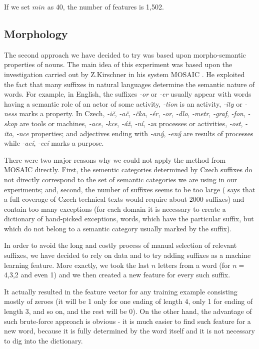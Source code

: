 \documentclass[letterpaper]{article}
\begin{document}
If we set $min$ as 40, the number of features is 1,502.

\subsection{Morphology}
The second approach we have decided to try was based upon morpho-semantic properties of nouns.
The main idea of this experiment was based upon the investigation carried out by Z.Kirschner in his system MOSAIC \cite{kirschner1983}. He exploited the fact that many suffixes in natural languages determine the semantic nature of words. For example, in English, the suffixes {\it -or} or {\it -er} usually appear with words having a semantic role of an actor of some activity, {\it -tion} is an activity, {\it -ity} or {\it -ness} marks a property. In Czech,  {\it -i\v{c}}, {\it -a\v{c}}, {\it -\v{c}ka}, {\it -\'{e}r}, {\it -or}, {\it -dlo}, {\it -metr}, {\it -graf}, {\it -fon}, {\it -skop} are tools or machines, {\it -ace}, {\it -kce}, {\it -\'{a}\v{z}}, {\it -n\'{i}}, {\it -za} processes or activities,
{\it -ost}, {\it -ita}, {\it -nce} properties; and adjectives ending with {\it -an\'{y}}, {\it -en\'{y}} are results of processes while {\it -ac\'{i}}, {\it -ec\'{i}} marks a purpose.

There were two major reasons why we could not apply the method from MOSAIC directly. First, the sementic categories determined by Czech suffixes do not directly correspond to the set of semantic categories we are using in our experiments; and, second, the number of suffixes seems to be too large (\cite{kirschner1983} says that a full coverage of Czech technical texts would require about 2000 suffixes) and contain too many exceptions (for each domain it is necessary to create a dictionary of hand-picked exceptions, words, which have the particular suffix, but which do not belong to a semantic category usually marked by the suffix).     
  
In order to avoid the long and costly process of manual selection of relevant suffixes, we have decided to rely on data and  
to try adding suffixes as a machine learning feature.  
More exactly, we took the last $n$ letters from 
a word (for $n=$ 4,3,2 and even 1) and we then created a new feature for every such suffix. 

It actually resulted in the feature vector for any training example consisting mostly of zeroes 
(it will be 1 only for one ending of length 4, only 1 for ending of length 3, and so on, 
and the rest will be 0). On the other hand, the advantage of such brute-force approach is obvious - 
it is much easier to find such feature 
for a new word, because it is fully determined by the word itself and it is not necessary to dig into the dictionary.
\end{document}
